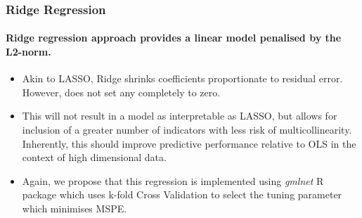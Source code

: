 \begin{frame}
\frametitle{Ridge Regression}
\framesubtitle{Ridge regression approach provides a linear model penalised by the L2-norm.}

\begin{itemize}
    \item Akin to LASSO, Ridge shrinks coefficients proportionate to residual error. However, does not set any completely to zero. 
    \item This will not result in a model as interpretable as LASSO, but allows for inclusion of a greater number of indicators with less risk of multicollinearity. Inherently, this should improve predictive performance relative to OLS in the context of high dimensional data. 
    \vspace{2mm}
    \item Again, we propose that this regression is implemented using \emph{gmlnet} R package which uses k-fold Cross Validation to select the tuning parameter which minimises MSPE. 
\end{itemize}
    
\end{frame}